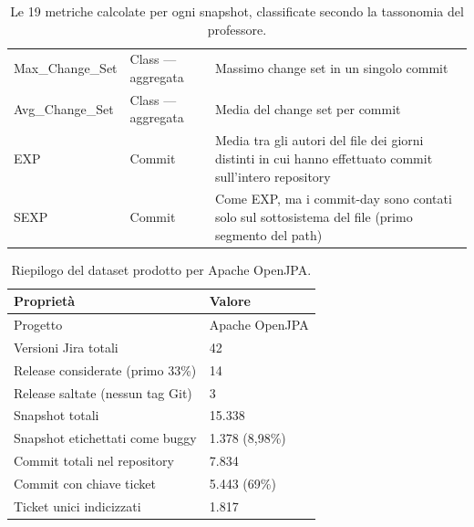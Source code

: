 \begin{table}[h!]
\begin{tabular}{@{}p{}p{}p{}@{}}
Max\_Change\_Set             & Class --- aggregata & Massimo change set in un singolo commit \\
Avg\_Change\_Set             & Class --- aggregata & Media del change set per commit \\
\midrule
EXP                          & Commit              & Media tra gli autori del file dei giorni distinti in cui hanno effettuato commit sull'intero repository \\
SEXP                         & Commit              & Come EXP, ma i commit-day sono contati solo sul sottosistema del file (primo segmento del path) \\
\bottomrule
\end{tabular}
\caption{Le 19 metriche calcolate per ogni snapshot, classificate secondo la tassonomia del professore.}
\label{tab:m1-metrics}
\end{table}

\begin{table}[h!]
\centering
\begin{tabular}{@{}ll@{}}
\toprule
\textbf{Proprietà} & \textbf{Valore} \\
\midrule
Progetto & Apache OpenJPA \\
Versioni Jira totali & 42 \\
Release considerate (primo 33\%) & 14 \\
Release saltate (nessun tag Git) & 3 \\
Snapshot totali & 15.338 \\
Snapshot etichettati come buggy & 1.378 (8,98\%) \\
Commit totali nel repository & 7.834 \\
Commit con chiave ticket & 5.443 (69\%) \\
Ticket unici indicizzati & 1.817 \\
\bottomrule
\end{tabular}
\caption{Riepilogo del dataset prodotto per Apache OpenJPA.}
\label{tab:r1-summary}
\end{table}

